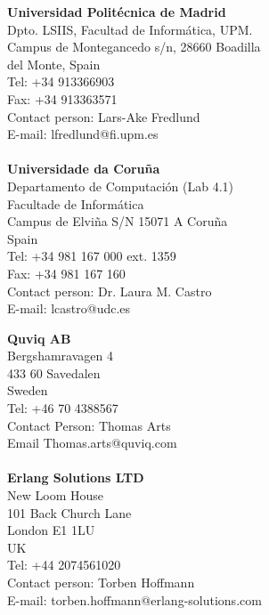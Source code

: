 \begin{footnotesize}
\begin{minipage}[t]{0.5\linewidth}
	\textbf{Universidad Polit\'ecnica de Madrid}\\
	Dpto. LSIIS, Facultad de Informática, UPM.\\
	Campus de Montegancedo s/n, 28660 Boadilla\\
	del Monte, Spain\\
	Tel: +34 913366903\\
	Fax: +34  913363571\\
	Contact person: Lars-Ake Fredlund\\
	E-mail: lfredlund@fi.upm.es\\
	\\
	
	\textbf{Universidade da Coru\~na}\\
	Departamento de Computaci\'on (Lab 4.1)\\
	Facultade de Inform\'atica\\
	Campus de Elvi\~na S/N 15071 A Coru\~na\\
	Spain\\
	Tel: +34 981 167 000 ext. 1359\\
	Fax: +34 981 167 160\\
	Contact person: Dr. Laura M. Castro\\
	E-mail: lcastro@udc.es\\
\end{minipage}
\begin{minipage}[t]{0.5\linewidth}
	\textbf{Quviq AB}\\
	Bergshamravagen 4\\
	433 60 Savedalen\\
	Sweden\\
	Tel: +46 70 4388567\\
	Contact Person: Thomas Arts\\
	Email Thomas.arts@quviq.com\\
	\\
	
	\textbf{Erlang Solutions LTD}\\
	New Loom House\\
	101 Back Church Lane\\
	London E1 1LU\\
    UK\\
	Tel: +44 2074561020\\
	Contact person: Torben Hoffmann\\
	E-mail: torben.hoffmann@erlang-solutions.com\\
	\\
	

\end{minipage}
\end{footnotesize}
